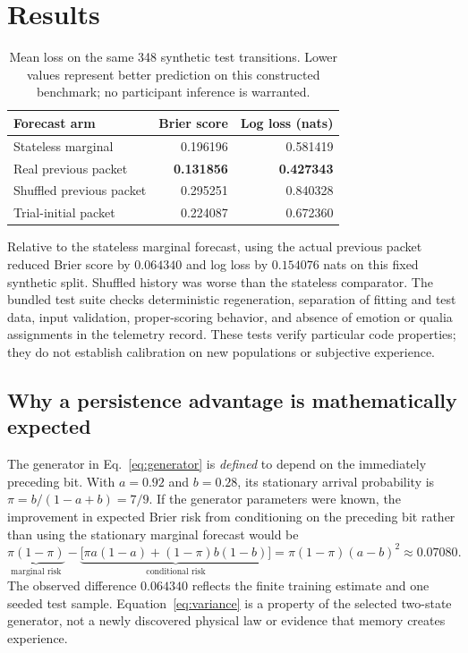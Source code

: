 \documentclass[11pt,a4paper]{article}
\begin{document}
\section{Results}
\begin{table}[ht]
\centering\small
\caption{Mean loss on the same 348 synthetic test transitions. Lower values represent better prediction on this constructed benchmark; no participant inference is warranted.}\label{tab:results}
\begin{tabular}{lrr}
\toprule
Forecast arm & Brier score & Log loss (nats)\\
\midrule
Stateless marginal & 0.196196 & 0.581419\\
Real previous packet & \textbf{0.131856} & \textbf{0.427343}\\
Shuffled previous packet & 0.295251 & 0.840328\\
Trial-initial packet & 0.224087 & 0.672360\\
\bottomrule
\end{tabular}
\end{table}
Relative to the stateless marginal forecast, using the actual previous packet reduced Brier score by $0.064340$ and log loss by $0.154076$ nats on this fixed synthetic split. Shuffled history was worse than the stateless comparator. The bundled test suite checks deterministic regeneration, separation of fitting and test data, input validation, proper-scoring behavior, and absence of emotion or qualia assignments in the telemetry record. These tests verify particular code properties; they do not establish calibration on new populations or subjective experience.

\subsection{Why a persistence advantage is mathematically expected}
The generator in Eq.~\eqref{eq:generator} is \emph{defined} to depend on the immediately preceding bit. With $a=0.92$ and $b=0.28$, its stationary arrival probability is $\pi=b/(1-a+b)=7/9$. If the generator parameters were known, the improvement in expected Brier risk from conditioning on the preceding bit rather than using the stationary marginal forecast would be
\begin{equation}\label{eq:variance}
 \underbrace{\pi(1-\pi)}_{\text{marginal risk}}
 -\underbrace{\bigl[\pi a(1-a)+(1-\pi)b(1-b)\bigr]}_{\text{conditional risk}}
 =\pi(1-\pi)(a-b)^2\approx0.07080.
\end{equation}
The observed difference $0.064340$ reflects the finite training estimate and one seeded test sample. Equation~\eqref{eq:variance} is a property of the selected two-state generator, not a newly discovered physical law or evidence that memory creates experience.
\end{document}
